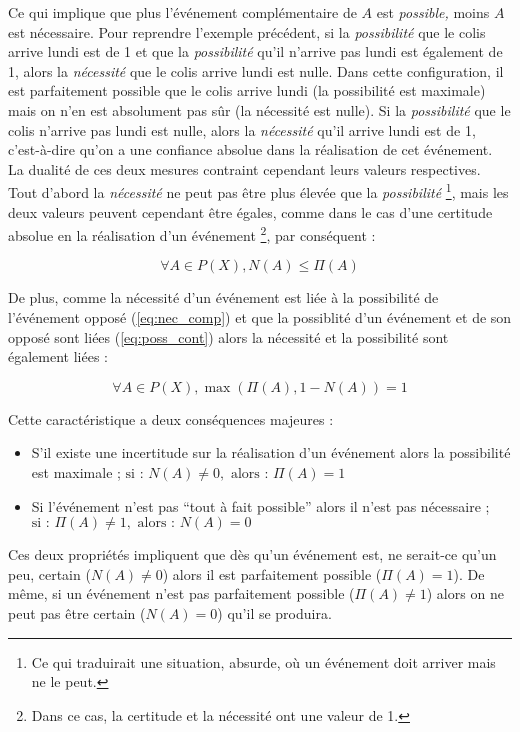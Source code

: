 Ce qui implique que plus l'événement complémentaire de \(A\) est
\emph{possible,} moins \(A\) est nécessaire. Pour reprendre l'exemple
précédent, si la \emph{possibilité} que le colis arrive lundi est de 1
et que la \emph{possibilité} qu'il n'arrive pas lundi est également de
1, alors la \emph{nécessité} que le colis arrive lundi est nulle. Dans
cette configuration, il est parfaitement possible que le colis arrive
lundi (\ie la possibilité est maximale) mais on n'en est absolument
pas sûr (\ie la nécessité est nulle). Si la \emph{possibilité} que le
colis n'arrive pas lundi est nulle, alors la \emph{nécessité} qu'il
arrive lundi est de 1, c'est-à-dire qu'on a une confiance absolue dans
la réalisation de cet événement. La dualité de ces deux mesures
contraint cependant leurs valeurs respectives. Tout d'abord la
\emph{nécessité} ne peut pas être plus élevée que la
\emph{possibilité} \footnote{Ce qui traduirait une situation, absurde,
  où un événement doit arriver mais ne le peut.}, mais les deux
valeurs peuvent cependant être égales, comme dans le cas d'une
certitude absolue en la réalisation d'un événement \footnote{Dans ce
  cas, la certitude et la nécessité ont une valeur de 1.}, par
conséquent :

\begin{equation}
  \forall A \in P(X), N(A) ≤ \Pi(A)
\end{equation}

De plus, comme la nécessité d'un événement est liée à la possibilité
de l'événement opposé (\autoref{eq:nec_comp}) et que la possiblité
d'un événement et de son opposé sont liées (\autoref{eq:poss_cont})
alors la nécessité et la possibilité sont également liées :

\begin{equation}
  \forall A \in P(X), \max(\Pi(A), 1-N(A)) = 1
\end{equation}

Cette caractéristique a deux conséquences majeures :

\begin{itemize}
\item S'il existe une incertitude sur la réalisation d'un événement
  alors la possibilité est maximale ;
  \(\text{si : } N(A) ≠ 0, \text{ alors : } Π(A)=1\)
\item Si l'événement n'est pas \enquote{tout à fait possible} alors il
  n'est pas nécessaire ;
  \(\text{si : } Π(A) ≠ 1, \text{ alors : } N(A)=0\)
\end{itemize}

Ces deux propriétés impliquent que dès qu'un événement est, ne
serait-ce qu'un peu, certain (\(N(A) ≠ 0\)) alors il est parfaitement
possible (\(Π(A)=1\)). De même, si un événement n'est pas parfaitement
possible (\(Π(A) ≠ 1\)) alors on ne peut pas être certain
(\(N(A) = 0\)) qu'il se produira.

